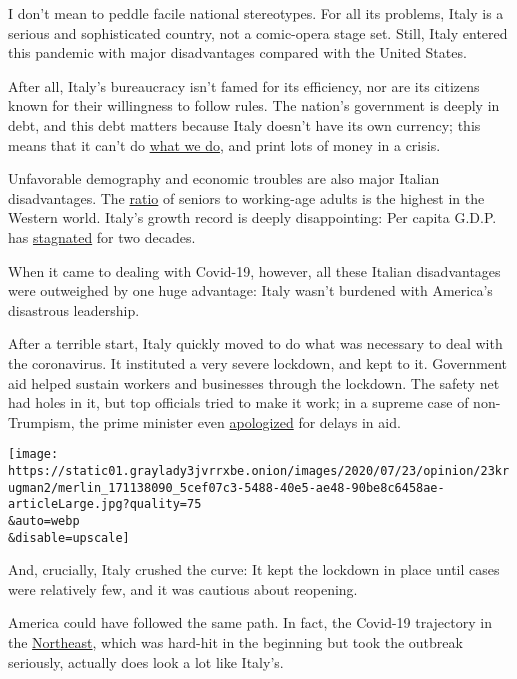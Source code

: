 I don't mean to peddle facile national stereotypes. For all its
problems, Italy is a serious and sophisticated country, not a
comic-opera stage set. Still, Italy entered this pandemic with major
disadvantages compared with the United States.

After all, Italy's bureaucracy isn't famed for its efficiency, nor are
its citizens known for their willingness to follow rules. The nation's
government is deeply in debt, and this debt matters because Italy
doesn't have its own currency; this means that it can't do
\href{https://www.nytimes3xbfgragh.onion/2020/07/22/opinion/economy-spending-modern-monetary-theory.html}{what
we do}, and print lots of money in a crisis.

Unfavorable demography and economic troubles are also major Italian
disadvantages. The
\href{https://data.oecd.org/pop/elderly-population.htm}{ratio} of
seniors to working-age adults is the highest in the Western world.
Italy's growth record is deeply disappointing: Per capita G.D.P. has
\href{https://fred.stlouisfed.org/series/NYGDPPCAPKDITA}{stagnated} for
two decades.

When it came to dealing with Covid-19, however, all these Italian
disadvantages were outweighed by one huge advantage: Italy wasn't
burdened with America's disastrous leadership.

After a terrible start, Italy quickly moved to do what was necessary to
deal with the coronavirus. It instituted a very severe lockdown, and
kept to it. Government aid helped sustain workers and businesses through
the lockdown. The safety net had holes in it, but top officials tried to
make it work; in a supreme case of non-Trumpism, the prime minister even
\href{https://www.bloomberg.com/news/articles/2020-05-01/europe-s-wary-reopening-begins-with-apology-by-italian-leader?sref=qzusa8bC}{apologized}
for delays in aid.

\texttt{[image: https://static01.graylady3jvrrxbe.onion/images/2020/07/23/opinion/23krugman2/merlin\_171138090\_5cef07c3-5488-40e5-ae48-90be8c6458ae-articleLarge.jpg?quality=75\\\&auto=webp\\\&disable=upscale]}

And, crucially, Italy crushed the curve: It kept the lockdown in place
until cases were relatively few, and it was cautious about reopening.

America could have followed the same path. In fact, the Covid-19
trajectory in the
\href{https://www.nytimes3xbfgragh.onion/2020/07/23/briefing/home-schooling-coronavirus-portland-your-thursday-briefing.html}{Northeast},
which was hard-hit in the beginning but took the outbreak seriously,
actually does look a lot like Italy's.

